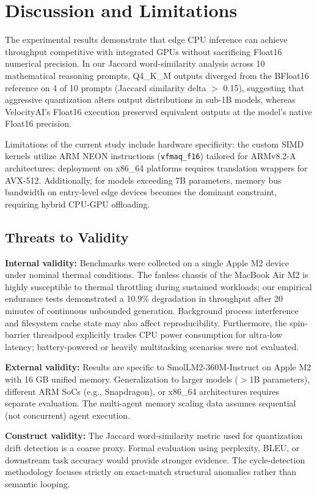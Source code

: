\documentclass[a4paper,twocolumn,10pt]{article}
\begin{document}
\section{Discussion and Limitations}
\label{sec:discussion}
The experimental results demonstrate that edge CPU inference can achieve throughput competitive with integrated GPUs without sacrificing Float16 numerical precision. In our Jaccard word-similarity analysis across 10 mathematical reasoning prompts, Q4\_K\_M outputs diverged from the BFloat16 reference on 4 of 10 prompts (Jaccard similarity delta $>$ 0.15), suggesting that aggressive quantization alters output distributions in sub-1B models, whereas VelocityAI's Float16 execution preserved equivalent outputs at the model's native Float16 precision.

Limitations of the current study include hardware specificity: the custom SIMD kernels utilize ARM NEON instructions (\texttt{vfmaq\_f16}) tailored for ARMv8.2-A architectures; deployment on x86\_64 platforms requires translation wrappers for AVX-512. Additionally, for models exceeding 7B parameters, memory bus bandwidth on entry-level edge devices becomes the dominant constraint, requiring hybrid CPU-GPU offloading.

\subsection{Threats to Validity}
\textbf{Internal validity:} Benchmarks were collected on a single Apple M2 device under nominal thermal conditions. The fanless chassis of the MacBook Air M2 is highly susceptible to thermal throttling during sustained workloads; our empirical endurance tests demonstrated a 10.9\% degradation in throughput after 20 minutes of continuous unbounded generation. Background process interference and filesystem cache state may also affect reproducibility. Furthermore, the spin-barrier threadpool explicitly trades CPU power consumption for ultra-low latency; battery-powered or heavily multitasking scenarios were not evaluated.

\textbf{External validity:} Results are specific to SmolLM2-360M-Instruct on Apple M2 with 16 GB unified memory. Generalization to larger models ($>$1B parameters), different ARM SoCs (e.g., Snapdragon), or x86\_64 architectures requires separate evaluation. The multi-agent memory scaling data assumes sequential (not concurrent) agent execution.

\textbf{Construct validity:} The Jaccard word-similarity metric used for quantization drift detection is a coarse proxy. Formal evaluation using perplexity, BLEU, or downstream task accuracy would provide stronger evidence. The cycle-detection methodology focuses strictly on exact-match structural anomalies rather than semantic looping.
\end{document}
